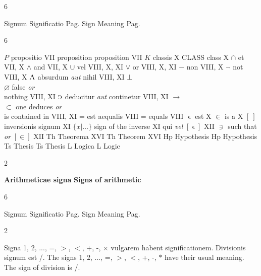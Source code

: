 \documentclass{book}
\newcommand{\s}{\switchcolumn} %
\newcommand{\C}{\mathop{\sbox0{$\displaystyle$$\reflectbox{C}$} %
\raisebox{-\height+\ht0-0.05cm}[\ht0][\dp0]{\scalebox{0.8}[0.8]{\copy0}}}\displaylimits} %
\newcommand{\abs}{\mathop{\rotatebox[origin=c]{180}{V}}}
\newcommand{\such}{\thinspace \rotatebox[origin=c]{180}{$\epsilon$}}
\newcommand{\smallIn}{\ensuremath{\mathrel{\epsilon}}}
\newenvironment{translateTwoCol}
               { %
                 \columnratio{0.5, 0.5} \begin{paracol}{2}
                 \newcommand{\LAT}{\switchcolumn[0]*}
                 \newcommand{\ENG}{\switchcolumn[1]}
               }
               { %
                 \let\ENG\undefined
                 \let\LAT\undefined
                 \end{paracol}
               }
\newenvironment{translateSixCol}[6]
               { %
                 \setcolumnwidth{#1\fill/1em, #2\fill/1em, #3\fill/\columnsep, #4\fill/1em, #5\fill/1em, #6\fill}
                 \begin{paracol}{6}
               }
               { %
                 \end{paracol}
               }
\begin{document}
\begin{translateSixCol}{0.05}{0.35}{0.1}{0.05}{0.35}{0.1}
\raggedright
Signum \s Significatio \s Pag.
\s Sign \s Meaning \s Pag.
\end{translateSixCol}

\begin{translateSixCol}{0.06}{0.34}{0.1}{0.06}{0.34}{0.1}
\raggedright
$P$ \s propositio \s VII
\s \scriptsize{proposition} \normalsize \s proposition \s VII
\s* $K$ \s classis \s X
\s \scriptsize{CLASS} \normalsize \s class \s X
\s* $\cap$ \s et \s VII, X
\s $\wedge$ \s and \s VII, X
\s* $\cup$ \s vel \s VIII, X, XI
\s $\vee$ \s or \s VIII, X, XI
\s* $-$ \s non \s VIII, X
\s $\neg$ \s not \s VIII, X
\s* $\abs$ \s absurdum \emph{aut} nihil \s VIII, XI
\s $\bot$ \\ $\varnothing$ \s false \emph{or} \\ \quad nothing \s VIII, XI
\s* $\C$ \s deducitur \emph{aut} continetur \s VIII, XI
\s $\rightarrow$ \\ $\subset$ \s one deduces \emph{or} \\ \quad is contained in \s VIII, XI
\s* = \s est aequalis \s VIII
\s = \s equals \s VIII
\s* $\smallIn$ \s est \s X
\s $\in$ \s is a \s X   %
\s* $[ \ ]$ \s inversionis signum \s XI
\s $\{ x | \ldots \}$ \s sign of the inverse \s XI
\s* \such \s qui \emph{vel} $[ \smallIn ]$ \s XII
\s $\ni$ \s such that \emph{or} $[ \in ]$ \s XII
\s* Th \s Theorema \s XVI
\s  Th \s \normalsize Theorem \s XVI
\s* Hp \s Hypothesis \s
\s  Hp \s \normalsize Hypothesis \s
\s* Ts \s Thesis \s
\s  Ts \s \normalsize Thesis \s
\s* L \s Logica \s
\s  L \s \normalsize Logic \s
\end{translateSixCol}

\vspace{1em}
\begin{translateTwoCol}
\centering
\textbf{Arithmeticae signa}
\ENG
\textbf{Signs of arithmetic}
\end{translateTwoCol}

\begin{translateSixCol}{0.05}{0.35}{0.1}{0.05}{0.35}{0.1}
\raggedright
Signum \s Significatio \s Pag.
\s Sign \s Meaning \s Pag.
\end{translateSixCol}

\begin{translateTwoCol}
\raggedright
Signa 1, 2, ..., =, $>$, $<$, +, -, $\times$ vulgarem habent significationem. Divisionis signum est /.
\ENG
The signs 1, 2, ..., =, $>$, $<$, +, -, $*$ have their usual meaning. The sign of division is /.
\end{translateTwoCol}
\end{document}
